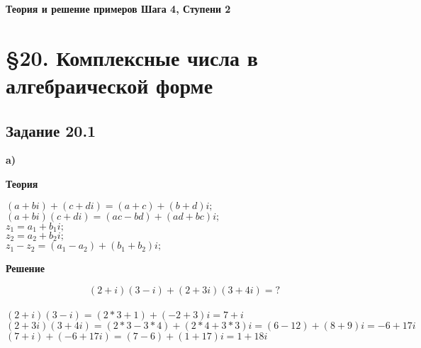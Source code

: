 \documentclass[12pt]{article}
\begin{document}
\begin{titlepage}
\begin{center}
\textbf{\huge Теория  и решение примеров Шага 4, Ступени 2}
\end{center}
\end{titlepage}
\tableofcontents
\newpage
\section{\S 20. Комплексные числа в алгебраической форме}
\subsection{Задание 20.1}
\textbf{a)}\\
\begin{center}\textbf{Теория}\end{center}
$ (a+bi) + (c+di) = (a+c)+(b+d)i; $ \\
$ (a+bi)(c+di) = (ac-bd)+(ad+bc)i; $\\
$ z_1 = a_1+b_1i;$\\
$ z_2 = a_2+b_2i;$\\
$ z_1 - z_2 = (a_1-a_2)+(b_1+b_2)i; $
\begin{center}\textbf{Решение}\end{center}
$$(2+i)(3-i)+(2+3i)(3+4i) = ?$$\\
$(2+i)(3-i)=(2*3+1)+(-2+3)i = 7+i$\\
$(2+3i)(3+4i) =(2*3-3*4)+( 2* 4+3*3)i=(6-12)+(8+9)i=-6+17i$\\
$(7+i)+(-6+17i)=(7-6)+(1+17)i=1+18i$
\end{document}
